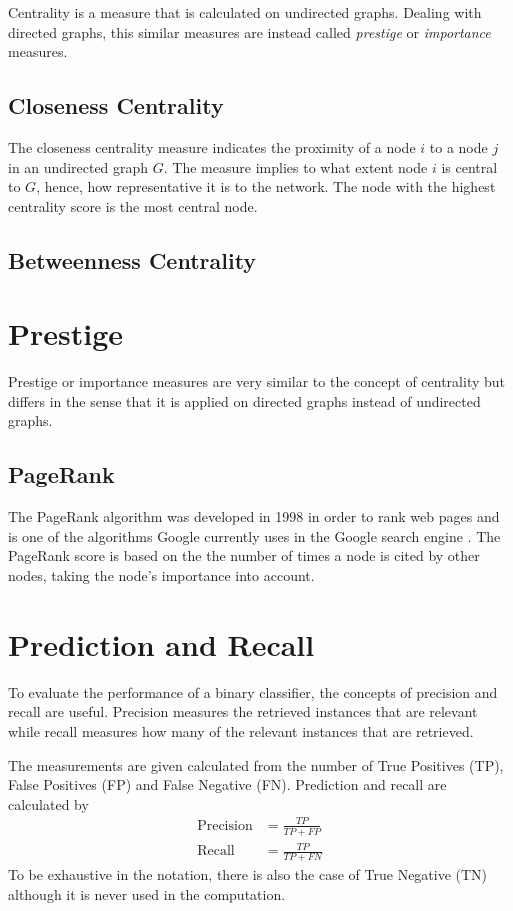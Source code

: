 Centrality is a measure that is calculated on undirected graphs. Dealing with directed graphs, this similar measures are instead called \textit{prestige} or \textit{importance} measures. \cite{fouss2016algorithms}


\subsection{Closeness Centrality}
The closeness centrality measure indicates the proximity of a node $i$ to a node $j$ in an undirected graph $G$. The measure implies to what extent node $i$ is central to $G$, hence, how representative it is to the network. The node with the highest centrality score is the most central node.



\subsection{Betweenness Centrality}




\section{Prestige}
Prestige or importance measures are very similar to the concept of centrality but differs in the sense that it is applied on directed graphs instead of undirected graphs. 


\subsection{PageRank}
The PageRank algorithm was developed in 1998 in order to rank web pages and is one of the algorithms Google currently uses in the Google search engine \cite{langville2004deeperinside,langville2012}. The PageRank score is based on the the number of times a node is cited by other nodes, taking the node's importance into account. 


\section{Prediction and Recall}
To evaluate the performance of a binary classifier, the concepts of precision and recall are useful. Precision measures the retrieved instances that are relevant while recall measures how many of the relevant instances that are retrieved.

The measurements are given calculated from the number of True Positives (TP), False Positives (FP) and False Negative (FN). Prediction and recall are calculated by 
\begin{align}
\text{Precision}&=\frac{TP}{TP+FP}\\
\text{Recall}&=\frac{TP}{TP+FN}
\end{align}
To be exhaustive in the notation, there is also the case of True Negative (TN) although it is never used in the computation.

